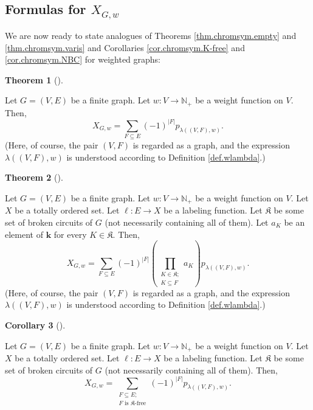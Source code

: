 \documentclass[numbers=enddot,12pt,final,onecolumn,notitlepage]{scrartcl}%
\theoremstyle{definition}
\newtheorem{theo}{Theorem}[section]
\newenvironment{theorem}[1][]
{\begin{theo}[#1]\begin{leftbar}}
{\end{leftbar}\end{theo}}
\newtheorem{coro}[theo]{Corollary}
\newenvironment{corollary}[1][]
{\begin{coro}[#1]\begin{leftbar}}
{\end{leftbar}\end{coro}}
\let\sumnonlimits\sum
\let\prodnonlimits\prod
\renewcommand{\sum}{\sumnonlimits\limits}
\renewcommand{\prod}{\prodnonlimits\limits}
\begin{document}
\subsection{Formulas for $X_{G,w}$}

We are now ready to state analogues of Theorems \ref{thm.chromsym.empty} and
\ref{thm.chromsym.varis} and Corollaries \ref{cor.chromsym.K-free} and
\ref{cor.chromsym.NBC} for weighted graphs:

\begin{theorem}
\label{thm.wchromsym.empty}Let $G=\left(  V,E\right)  $ be a finite graph. Let
$w:V\rightarrow\mathbb{N}_{+}$ be a weight function on $V$. Then,%
\[
X_{G,w}=\sum_{F\subseteq E}\left(  -1\right)  ^{\left\vert F\right\vert
}p_{\lambda\left(  \left(  V,F\right)  ,w\right)  }.
\]
(Here, of course, the pair $\left(  V,F\right)  $ is regarded as a graph, and
the expression $\lambda\left(  \left(  V,F\right)  ,w\right)  $ is understood
according to Definition \ref{def.wlambda}.)
\end{theorem}

\begin{theorem}
\label{thm.wchromsym.varis}Let $G=\left(  V,E\right)  $ be a finite graph. Let
$w:V\rightarrow\mathbb{N}_{+}$ be a weight function on $V$. Let $X$ be a
totally ordered set. Let $\ell:E\rightarrow X$ be a labeling function. Let
$\mathfrak{K}$ be some set of broken circuits of $G$ (not necessarily
containing all of them). Let $a_{K}$ be an element of $\mathbf{k}$ for every
$K\in\mathfrak{K}$. Then,%
\[
X_{G,w}=\sum_{F\subseteq E}\left(  -1\right)  ^{\left\vert F\right\vert
}\left(  \prod_{\substack{K\in\mathfrak{K};\\K\subseteq F}}a_{K}\right)
p_{\lambda\left(  \left(  V,F\right)  ,w\right)  }.
\]
(Here, of course, the pair $\left(  V,F\right)  $ is regarded as a graph, and
the expression $\lambda\left(  \left(  V,F\right)  ,w\right)  $ is understood
according to Definition \ref{def.wlambda}.)
\end{theorem}

\begin{corollary}
\label{cor.wchromsym.K-free}Let $G=\left(  V,E\right)  $ be a finite graph.
Let $w:V\rightarrow\mathbb{N}_{+}$ be a weight function on $V$. Let $X$ be a
totally ordered set. Let $\ell:E\rightarrow X$ be a labeling function. Let
$\mathfrak{K}$ be some set of broken circuits of $G$ (not necessarily
containing all of them). Then,%
\[
X_{G,w}=\sum_{\substack{F\subseteq E;\\F\text{ is }\mathfrak{K}\text{-free}%
}}\left(  -1\right)  ^{\left\vert F\right\vert }p_{\lambda\left(  \left(
V,F\right)  ,w\right)  }.
\]

\end{corollary}
\end{document}
